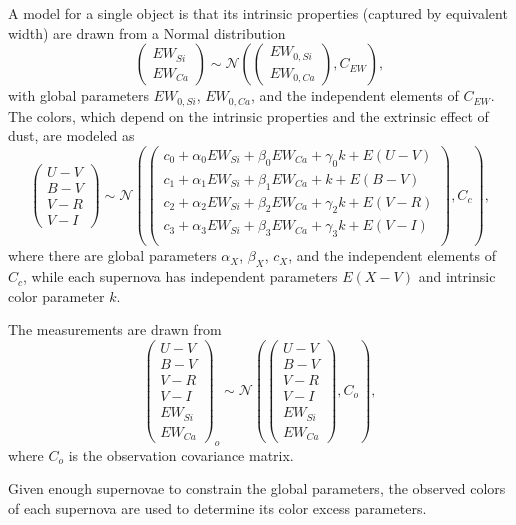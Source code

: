\documentclass[11pt, oneside]{article}   	%
\begin{document}
A model for a single object is that its intrinsic properties (captured by equivalent width) are drawn from a Normal distribution
\begin{equation}
\left(
\begin{matrix}
EW_{Si}\\ EW_{Ca}
\end{matrix}
\right) \sim \mathcal{N}
\left(
\left(
\begin{matrix}
EW_{0, Si}\\ EW_{0, Ca}
\end{matrix}
\right)
,C_{EW}
\right),
\end{equation}
with global parameters $EW_{0, Si}$, $EW_{0, Ca}$, and the independent elements of $C_{EW}$.
The colors, which depend on the intrinsic properties and the extrinsic effect of dust, are modeled as
\begin{equation}
\left(
\begin{matrix}
U-V\\B-V\\V-R\\V-I
\end{matrix}
\right) \sim \mathcal{N}
\left(
\left(
\begin{matrix}
c_0+\alpha_0 EW_{Si} + \beta_0 EW_{Ca} +\gamma_0 k+ E(U-V) \\
c_1+\alpha_1 EW_{Si} + \beta_1 EW_{Ca}  +k +E(B-V) \\
c_2+\alpha_2 EW_{Si} + \beta_2 EW_{Ca} +\gamma_2 k + E(V-R)\\
c_3+\alpha_3 EW_{Si} + \beta_3 EW_{Ca} +\gamma_3 k +E(V-I)\\
\end{matrix}
\right)
,C_c
\right),
\end{equation}
where there are global parameters $\alpha_X$, $\beta_X$, $c_X$,  and the independent elements of $C_c$,
while each supernova has independent parameters $E(X-V)$ and intrinsic color parameter $k$.

The measurements are drawn from
\begin{equation}
\left(
\begin{matrix}
U-V\\B-V\\V-R\\V-I\\EW_{Si}\\ EW_{Ca}
\end{matrix}
\right)_o \sim \mathcal{N}
\left(
\left(
\begin{matrix}
U-V\\B-V\\V-R\\V-I\\EW_{Si}\\ EW_{Ca}
\end{matrix}
\right)
,C_o
\right),
\end{equation}
where $C_o$ is the observation covariance matrix.

Given enough supernovae to constrain the global parameters, the observed colors of each supernova are used to determine its
color excess parameters.
\end{document}
